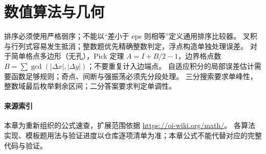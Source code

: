 \section{数值算法与几何}
排序必须使用严格弱序；不能以“差小于 eps 则相等”定义通用排序比较器。
叉积与行列式容易发生抵消；整数题优先精确整数判定，浮点构造单独处理误差。
对于简单格点多边形（无孔），Pick 定理 $A=I+B/2-1$，边界格点数
$B=\sum\gcd(|\Delta x|,|\Delta y|)$；不要重复计入边端点。
自适应积分的局部误差估计需要函数足够规则；奇点、间断与强振荡必须先分段处理。
三分搜索要求单峰性，整数域最后枚举剩余区间；二分答案要求判定单调性。

\paragraph{来源索引}
本章为重新组织的公式速查，扩展范围依据 \url{https://oi-wiki.org/math/}。
各算法实现、模板题用法与验证进度以仓库逐项清单为准；本章公式不能代替对应的完整代码与验证。

